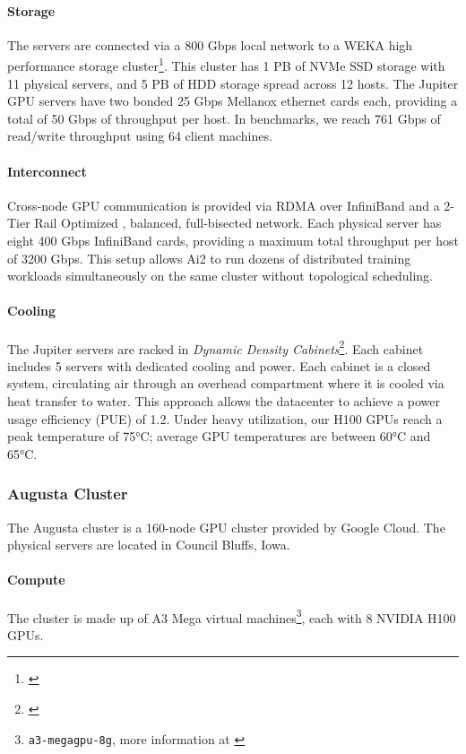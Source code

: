 \documentclass[table]{ai2style/ai2}
\begin{document}
\paragraph{Storage} The servers are connected via a 800 Gbps local network to a WEKA high performance storage cluster\footnote{\href{https://www.weka.io/}{}}. This cluster has 1 PB of NVMe SSD storage with 11 physical servers, and 5 PB of HDD storage spread across 12 hosts. The Jupiter GPU servers have two bonded 25 Gbps Mellanox ethernet cards each, providing a total of 50 Gbps of throughput per host. In benchmarks, we reach 761 Gbps of read/write throughput using 64 client machines. 

\paragraph{Interconnect} Cross-node GPU communication is provided via RDMA over InfiniBand and a 2-Tier Rail Optimized \citep{wang2023rail}, balanced, full-bisected network. Each physical server has eight 400 Gbps InfiniBand cards, providing a maximum total throughput per host of 3200 Gbps. This setup allows Ai2 to run dozens of distributed training workloads simultaneously on the same cluster without topological scheduling.

\paragraph{Cooling} The Jupiter servers are racked in \textit{Dynamic Density Cabinets}\footnote{\href{https://www.cirrascale.com/products-and-services/cabinet-technologies}{}}. Each cabinet includes 5 servers with dedicated cooling and power. Each cabinet is a closed system, circulating air through an overhead compartment where it is cooled via heat transfer to water. This approach allows the datacenter to achieve a power usage efficiency (PUE) of 1.2. 
Under heavy utilization, our H100 GPUs reach a peak temperature of 75°C; average GPU temperatures are between 60°C and 65°C.

\subsubsection{Augusta Cluster}

The Augusta cluster is a 160-node GPU cluster provided by Google Cloud. The physical servers are located in Council Bluffs, Iowa.

\paragraph{Compute} The cluster is made up of A3 Mega virtual machines\footnote{\texttt{a3-megagpu-8g}, more information at \href{https://cloud.google.com/compute/docs/accelerator-optimized-machines}{}}, each with 8 NVIDIA H100 GPUs.
\end{document}
